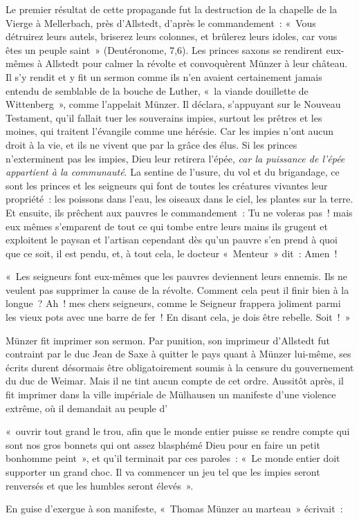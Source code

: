 \documentclass[french,twoside]{book} %
\newenvironment{quoteblock}%
  {\begin{quoting}}
  {\end{quoting}}
\newenvironment{quotebar}{%
    \def\FrameCommand{{\color{rubric!10!}\vrule width 0.5em} \hspace{0.9em}}%
    \def\OuterFrameSep{\itemsep} %
    \MakeFramed {\advance\hsize-\width \FrameRestore}
  }%
  {%
    \endMakeFramed
  }
\renewenvironment{quoteblock}%
  {%
    \savenotes
    \setstretch{0.9}
    \normalfont
    \begin{quotebar}
  }
  {%
    \end{quotebar}
    \spewnotes
  }
\begin{document}
Le premier résultat de cette propagande fut la destruction de la chapelle de la Vierge à Mellerbach, près d’Allstedt, d’après le commandement : « Vous détruirez leurs autels, briserez leurs colonnes, et brûlerez leurs idoles, car vous êtes un peuple saint » (Deutéronome, 7,6). Les princes saxons se rendirent eux-mêmes à Allstedt pour calmer la révolte et convoquèrent Münzer à leur château. Il s’y rendit et y fit un sermon comme ils n’en avaient certainement jamais entendu de semblable de la bouche de Luther, « la viande douillette de Wittenberg », comme l’appelait Münzer. Il déclara, s’appuyant sur le Nouveau Testament, qu’il fallait tuer les souverains impies, surtout les prêtres et les moines, qui traitent l’évangile comme une hérésie. Car les impies n’ont aucun droit à la vie, et ils ne vivent que par la grâce des élus. Si les princes n’exterminent pas les impies, Dieu leur retirera l’épée, \emph{car la puissance de l’épée appartient à la communauté}. La sentine de l’usure, du vol et du brigandage, ce sont les princes et les seigneurs qui font de toutes les créatures vivantes leur propriété : les poissons dans l’eau, les oiseaux dans le ciel, les plantes sur la terre. Et ensuite, ils prêchent aux pauvres le commandement : Tu ne voleras pas ! mais eux mêmes s’emparent de tout ce qui tombe entre leurs mains ils grugent et exploitent le paysan et l’artisan cependant dès qu’un pauvre s’en prend à quoi que ce soit, il est pendu, et, à tout cela, le docteur « Menteur » dit : Amen !\par

\begin{quoteblock}
 \noindent « Les seigneurs font eux-mêmes que les pauvres deviennent leurs ennemis. Ils ne veulent pas supprimer la cause de la révolte. Comment cela peut il finir bien à la longue ? Ah ! mes chers seigneurs, comme le Seigneur frappera joliment parmi les vieux pots avec une barre de fer ! En disant cela, je dois être rebelle. Soit ! »
\end{quoteblock}

\noindent Münzer fit imprimer son sermon. Par punition, son imprimeur d’Allstedt fut contraint par le duc Jean de Saxe à quitter le pays quant à Münzer lui-même, ses écrits durent désormais être obligatoirement soumis à la censure du gouvernement du duc de Weimar. Mais il ne tint aucun compte de cet ordre. Aussitôt après, il fit imprimer dans la ville impériale de Mülhausen un manifeste d’une violence extrême, où il demandait au peuple d’\par
« ouvrir tout grand le trou, afin que le monde entier puisse se rendre compte qui sont nos gros bonnets qui ont assez blasphémé Dieu pour en faire un petit bonhomme peint », et qu’il terminait par ces paroles : « Le monde entier doit supporter un grand choc. Il va commencer un jeu tel que les impies seront renversés et que les humbles seront élevés ».\par
En guise d’exergue à son manifeste, « Thomas Münzer au marteau » écrivait :\par
\end{document}
